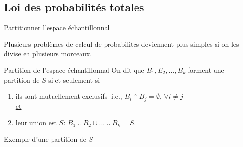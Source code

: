 \documentclass{BeamerTemplate}
\begin{document}

\subsection{Loi des probabilités totales}

\begin{frame}[t]{Partitionner l'espace échantillonnal}

{\small Plusieurs problèmes de calcul de probabilités
 deviennent plus simples si on les divise en
 plusieurs morceaux. %

 \begin{Boite}{Partition de l'espace échantillonnal}
  On dit que $B_1,B_2,\ldots,B_k$ forment une \alert{partition
  de $S$} si et seulement si
  \begin{enumerate}
   \item ils sont mutuellement exclusifs, i.e., $B_i\cap B_j=\emptyset,\ \forall i\neq j$\\

   \underline{et}
   \item leur union est $S$: $B_1\cup B_2\cup ...\cup B_k=S$.
  \end{enumerate}
 \end{Boite}
}
\end{frame}

\begin{frame}[t]{Exemple d'une partition de $S$}

\begin{center}
\end{center}

\end{frame}
\end{document}
